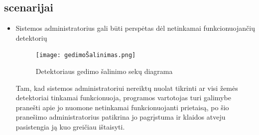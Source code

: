 \documentclass[oneside]{VUMIFPSkursinis}
\begin{document}
\subsection{scenarijai}
\begin{itemize}
\item Sistemos administratorius gali būti perspėtas dėl netinkamai funkcionuojančių detektorių
\begin{figure}[H]
		\centering	
	\texttt{[image: gedimoŠalinimas.png]}
	\caption{Detektoriaus gedimo šalinimo sekų diagrama}
	\label{fig:gedimoŠalinimas}
	\end{figure}
	Tam, kad sistemos administratoriui nereiktų nuolat tikrinti ar visi žemės detektoriai tinkamai funkcionuoja, programos vartotojas turi galimybe pranešti apie jo nuomone netinkamai funkcionuojanti prietaisą, po šio pranešimo administratorius patikrina jo pagrįstuma ir klaidos atveju pasistengia ją kuo greičiau ištaisyti.
\end{itemize}
\end{document}
